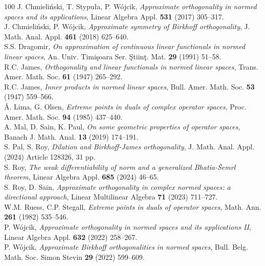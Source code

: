 \documentclass[11pt, reqno]{amsart}
\theoremstyle{definition}
\begin{document}
\begin{thebibliography}{100}
 J. Chmieli\'nski, T. Stypu\l a, P. W\'ojcik, \textit{Approximate
orthogonality in normed spaces and its applications}, Linear Algebra Appl. \textbf{531}
(2017) 305--317.\\

 J. Chmieli\'nski, P. W\'ojcik, \textit{Approximate symmetry of Birkhoff
orthogonality}, J. Math. Anal. Appl. \textbf{461} (2018) 625--640.\\

 S.S. Dragomir, \textit{On approximation of continuous linear functionals
in normed linear spaces}, An. Univ. Timi\c{s}oara Ser. \c{S}tiin\c{t}. Mat. \textbf{29}
(1991) 51--58.\\

 R.C. James, \textit{Orthogonality and linear functionals in normed linear
spaces}, Trans. Amer. Math. Soc. \textbf{61} (1947) 265--292.\\

 R.C. James, \textit{Inner products in normed linear spaces}, Bull. Amer.
Math. Soc. \textbf{53} (1947) 559--566.\\

 \AA{}. Lima, G. Olsen, \textit{Extreme points in duals of complex operator
spaces}, Proc. Amer. Math. Soc. \textbf{94} (1985) 437--440.\\

 A. Mal, D. Sain, K. Paul, \textit{On some geometric properties of operator
spaces}, Banach J. Math. Anal. \textbf{13} (2019) 174--191.\\

 S. Pal, S. Roy, \textit{Dilation and Birkhoff-James orthogonality}, J. Math.
Anal. Appl. (2024) Article 128326, 31 pp.\\

 S. Roy, \textit{The weak differentiability of norm and a generalized
Bhatia-\v{S}emrl theorem}, Linear Algebra Appl. \textbf{685} (2024) 46--65.\\

 S. Roy, D. Sain, \textit{Approximate orthogonality in complex normed
spaces: a directional approach}, Linear Multilinear Algebra \textbf{71} (2023)
711--727.\\

 W.M. Ruess, C.P. Stegall, \textit{Extreme points in duals of operator
spaces}, Math. Ann. \textbf{261} (1982) 535--546.\\

 P. W\'ojcik, \textit{Approximate orthogonality in normed spaces and its
applications II}, Linear Algebra Appl. \textbf{632} (2022) 258--267.\\

 P. W\'ojcik, \textit{Approximate Birkhoff orthogonalities in normed
spaces}, Bull. Belg. Math. Soc. Simon Stevin \textbf{29} (2022) 599--609.\\

\end{thebibliography}
\end{document}
